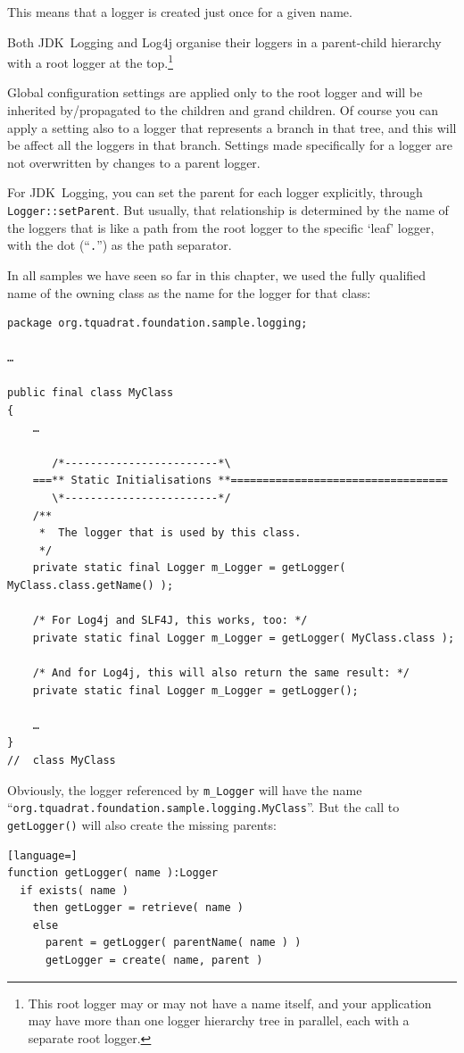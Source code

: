 This means that a logger is created just once for a given name.

Both JDK~Logging and Log4j organise their loggers in a parent-child hierarchy with a root logger at the top.\footnote{This root logger may or may not have a name itself, and your application may have more than one logger hierarchy tree in parallel, each with a separate root logger.}

Global configuration settings are applied only to the root logger and will be inherited by/propagated to the children and grand children. Of course you can apply a setting also to a logger that represents a branch in that tree, and this will be affect all the loggers in that branch. Settings made specifically for a logger are not overwritten by changes to a parent logger.

For JDK~Logging, you can set the parent for each logger explicitly, through \lstinline|Logger::setParent|\autocite{ORACLE_DOC_LOGGER:setParent}. But usually, that relationship is determined by the name of the loggers that is like a path from the root logger to the specific ‘leaf’ logger, with the dot (“\verb#.#”) as the path separator.

In all samples we have seen so far in this chapter, we used the fully qualified name of the owning class as the name for the logger for that class:
\begin{lstlisting}
package org.tquadrat.foundation.sample.logging;

…

public final class MyClass
{
    …
    
       /*------------------------*\
    ===** Static Initialisations **==================================
       \*------------------------*/
    /**
     *  The logger that is used by this class.
     */
    private static final Logger m_Logger = getLogger( MyClass.class.getName() );
    
    /* For Log4j and SLF4J, this works, too: */
    private static final Logger m_Logger = getLogger( MyClass.class );
    
    /* And for Log4j, this will also return the same result: */
    private static final Logger m_Logger = getLogger();
    
    …
}
//  class MyClass
\end{lstlisting}

Obviously, the logger referenced by \lstinline|m_Logger| will have the name “\verb#org.tquadrat.foundation.sample.logging.MyClass#”. But the call to \lstinline|getLogger()| will also create the missing parents:
\begin{lstlisting}[language=]
function getLogger( name ):Logger
  if exists( name )
    then getLogger = retrieve( name )
    else
      parent = getLogger( parentName( name ) )
      getLogger = create( name, parent )  
\end{lstlisting}

